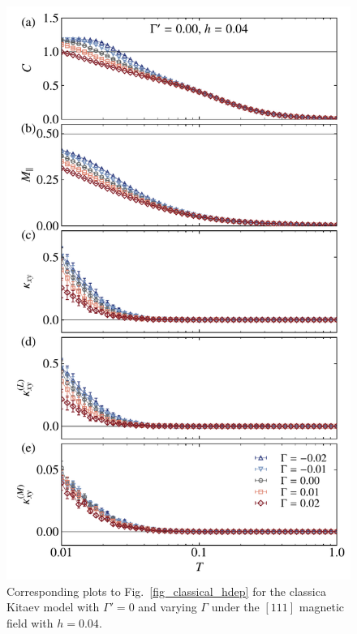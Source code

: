 \documentclass[twocolumn,superscriptaddress,showpacs, longbibliography, aps, prx]{revtex4-2}
\begin{document}
\begin{figure}[t] 
\begin{center} 
\includegraphics[width=\linewidth]{Data_for_figs/plot/fig-15-classical-gamma_dep.pdf}
\vspace{-0.5cm} 
\caption{
Corresponding plots to Fig.~\ref{fig_classical_hdep} for the classica Kitaev model with $\Gamma'=0$ and varying $\Gamma$ under the $[111]$ magnetic field with $h=0.04$.}
\label{fig_classical_gdep004}
\end{center}
\end{figure}
\end{document}
